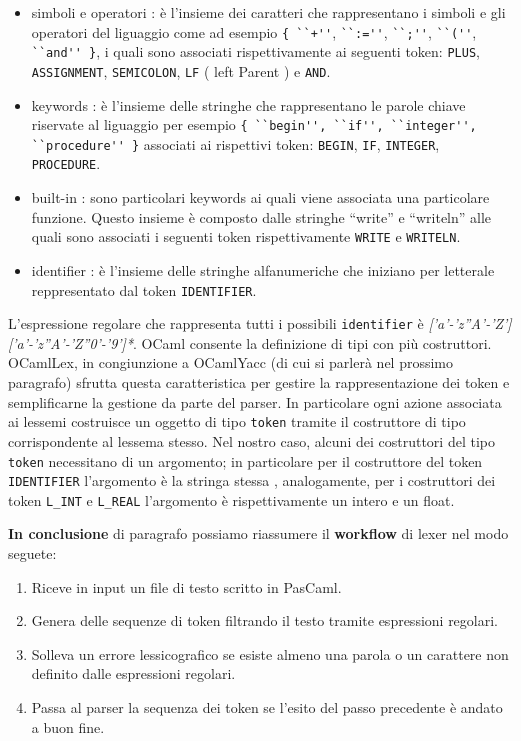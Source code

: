 \documentclass[a4paper,10pt]{article}
\begin{document}
\begin{itemize}
 \item simboli e operatori : \`e l'insieme dei caratteri che rappresentano i 
simboli e gli operatori del liguaggio come ad esempio \verb|{ ``+''|,
\verb|``:=''|, \verb|``;''|, \verb|``(''|, \verb|``and'' }|, i quali sono
associati rispettivamente ai seguenti token: \verb|PLUS|, \verb|ASSIGNMENT|,
\verb|SEMICOLON|, \verb|LF| ( left Parent ) e \verb|AND|.
\end{itemize}
\begin{itemize}
 \item keywords : \`e l'insieme delle stringhe che rappresentano le parole 
chiave riservate al liguaggio
per esempio \verb|{ ``begin'', ``if'', ``integer'', ``procedure'' }| associati 
ai rispettivi token: \verb|BEGIN|, \verb|IF|, \verb|INTEGER|, \verb|PROCEDURE|.
\end{itemize}
\begin{itemize}
 \item built-in : sono particolari keywords ai quali viene associata una 
particolare funzione.
Questo insieme \`e composto dalle stringhe ``write'' e ``writeln'' alle quali 
sono associati i seguenti token rispettivamente \verb|WRITE| e \verb|WRITELN|.
\end{itemize}
\begin{itemize}
 \item identifier : \`e l'insieme delle stringhe alfanumeriche che iniziano per 
letterale reppresentato dal token \verb|IDENTIFIER|.
\end{itemize} 
L'espressione regolare che rappresenta tutti i possibili \verb|identifier| \`e \textit{['a'-'z''A'-'Z']['a'-'z''A'-'Z''0'-'9']*}.
OCaml consente la definizione di tipi con pi\`u costruttori.
OCamlLex, in congiunzione a OCamlYacc (di cui si parler\`a nel prossimo 
paragrafo) sfrutta questa caratteristica per gestire la rappresentazione dei
token e semplificarne la gestione da parte del parser.
In particolare ogni azione associata ai lessemi costruisce un oggetto di tipo 
\verb|token| tramite il costruttore di tipo corrispondente al lessema stesso.
Nel nostro caso, alcuni dei costruttori del tipo \verb|token| necessitano di 
un argomento; in particolare per il costruttore del token \verb|IDENTIFIER|
l'argomento \`e la stringa stessa , analogamente, per i costruttori dei token
\verb|L_INT| e \verb|L_REAL| l'argomento \`e rispettivamente un intero e un
float.

\textbf{In conclusione} di paragrafo possiamo riassumere il \textbf{workflow} 
di lexer nel modo seguete:
\begin{enumerate}
\item Riceve in input un file di testo scritto in PasCaml.
\item Genera delle sequenze di token filtrando il testo tramite espressioni 
regolari.
\item Solleva un errore lessicografico se esiste almeno una parola o un 
carattere non definito dalle espressioni regolari.
\item Passa al parser la sequenza dei token se l'esito del passo precedente \`e 
andato a buon fine.
\end{enumerate}
\end{document}

